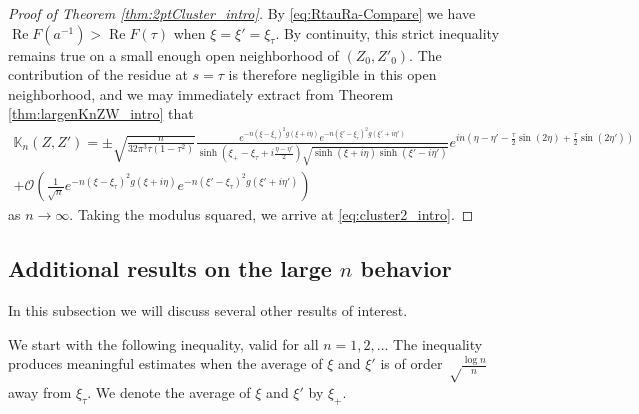 \documentclass[%
 jmp,
cp,  %
 amsmath,amsthm,amssymb,%
 reprint,%
onecolumn]{revtex4-2}
\begin{document}
\begin{proof}[Proof of Theorem \ref{thm:2ptCluster_intro}]
    By \eqref{eq:RtauRa-Compare} we have $\operatorname{Re} F(a^{-1}) > \operatorname{Re} F(\tau)$ when $\xi=\xi'=\xi_\tau$.   By continuity, this strict inequality remains true on a small enough open neighborhood of $(Z_0, Z'_0)$. The contribution of the residue at $s=\tau$ is therefore negligible in this open neighborhood, and we may immediately extract from Theorem \ref{thm:largenKnZW_intro} that
    \begin{multline*}
    \mathbb K_n(Z,Z') 
    = \pm \sqrt{\frac{n}{32 \pi^3 \tau(1-\tau^2)}} 
    \frac{e^{- n (\xi-\xi_\tau)^2 g(\xi+i\eta)} e^{- n (\xi'-\xi_\tau)^2 g(\xi'+i\eta')}}{\sinh\left(\xi_+-\xi_\tau+i\frac{\eta-\eta'}{2}\right)\sqrt{\sinh(\xi+i\eta) \sinh(\xi'-i\eta')}}
    e^{i n (\eta-\eta' - \frac{\tau}{2} \sin(2\eta)+\frac{\tau}{2} \sin(2\eta'))}\\
    + \mathcal O\left(\frac{1}{\sqrt n} e^{- n (\xi-\xi_\tau)^2 g(\xi+i\eta)} e^{- n (\xi'-\xi_\tau)^2 g(\xi'+i\eta')}\right)
    \end{multline*} 
    as $n\to\infty$. Taking the modulus squared, we arrive at \eqref{eq:cluster2_intro}.  
    \end{proof}
    
\subsection{Additional results on the large $n$ behavior}

In this subsection we will discuss several other results of interest. 

We start with the following inequality, valid for all $n=1,2,\ldots$  The inequality produces meaningful estimates when the average of $\xi$ and $\xi'$ is of order $\sqrt\frac{\log n}{n}$ away from $\xi_\tau$. We denote the average of $\xi$ and $\xi'$ by $\xi_+$. 
\end{document}
